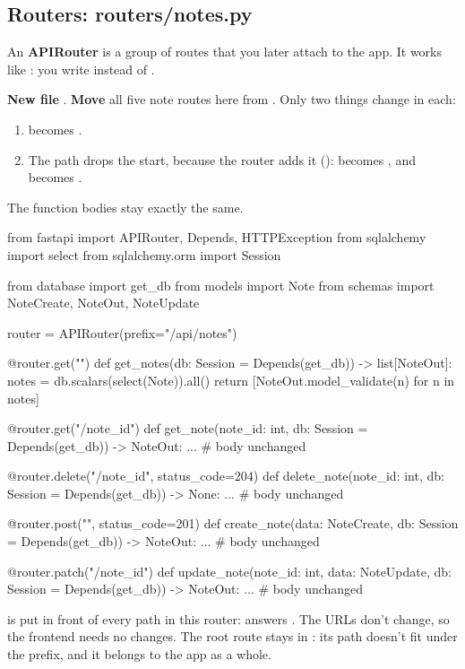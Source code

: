 \subsection{Routers: routers/notes.py}

An \textbf{APIRouter} is a group of routes that you later attach to the app. It works like : you write  instead of .

\textbf{New file} . \textbf{Move} all five note routes here from . Only two things change in each:
\begin{enumerate}
\item {} becomes .
\item The path drops the  start, because the router adds it ():  becomes , and  becomes .
\end{enumerate}

The function bodies stay exactly the same.

\begin{py}
from fastapi import APIRouter, Depends, HTTPException
from sqlalchemy import select
from sqlalchemy.orm import Session

from database import get_db
from models import Note
from schemas import NoteCreate, NoteOut, NoteUpdate

router = APIRouter(prefix="/api/notes")


@router.get("")
def get_notes(db: Session = Depends(get_db)) -> list[NoteOut]:
	notes = db.scalars(select(Note)).all()
	return [NoteOut.model_validate(n) for n in notes]


@router.get("/{note_id}")
def get_note(note_id: int, db: Session = Depends(get_db)) -> NoteOut:
	...  # body unchanged


@router.delete("/{note_id}", status_code=204)
def delete_note(note_id: int, db: Session = Depends(get_db)) -> None:
	...  # body unchanged


@router.post("", status_code=201)
def create_note(data: NoteCreate, db: Session = Depends(get_db)) -> NoteOut:
	...  # body unchanged


@router.patch("/{note_id}")
def update_note(note_id: int, data: NoteUpdate, db: Session = Depends(get_db)) -> NoteOut:
	...  # body unchanged
\end{py}

 is put in front of every path in this router:  answers . The URLs don't change, so the frontend needs no changes. The root route \cd{/} stays in : its path doesn't fit under the prefix, and it belongs to the app as a whole.

